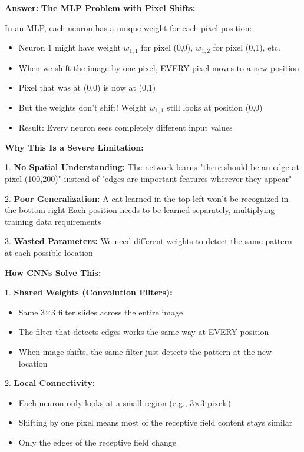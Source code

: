 \documentclass[12pt]{article}
\newcommand{\answer}[1]{{\color{answercolor}\textbf{Answer:} #1}}
\newcommand{\explanation}[1]{{\color{explanationcolor}#1}}
\begin{document}
\begin{enumerate}[(a)]
    \answer{
    \textbf{The MLP Problem with Pixel Shifts:}
    
    \explanation{
    In an MLP, each neuron has a unique weight for each pixel position:
    \begin{itemize}
        \item Neuron 1 might have weight $w_{1,1}$ for pixel (0,0), $w_{1,2}$ for pixel (0,1), etc.
        \item When we shift the image by one pixel, EVERY pixel moves to a new position
        \item Pixel that was at (0,0) is now at (0,1)
        \item But the weights don't shift! Weight $w_{1,1}$ still looks at position (0,0)
        \item Result: Every neuron sees completely different input values
    \end{itemize}
    }
    
    \textbf{Why This Is a Severe Limitation:}
    
    \explanation{
    1. \textbf{No Spatial Understanding:}
    The network learns "there should be an edge at pixel (100,200)" instead of "edges are important features wherever they appear"
    
    2. \textbf{Poor Generalization:}
    A cat learned in the top-left won't be recognized in the bottom-right
    Each position needs to be learned separately, multiplying training data requirements
    
    3. \textbf{Wasted Parameters:}
    We need different weights to detect the same pattern at each possible location
    }
    
    \textbf{How CNNs Solve This:}
    
    \explanation{
    1. \textbf{Shared Weights (Convolution Filters):}
    \begin{itemize}
        \item Same 3×3 filter slides across the entire image
        \item The filter that detects edges works the same way at EVERY position
        \item When image shifts, the same filter just detects the pattern at the new location
    \end{itemize}
    
    2. \textbf{Local Connectivity:}
    \begin{itemize}
        \item Each neuron only looks at a small region (e.g., 3×3 pixels)
        \item Shifting by one pixel means most of the receptive field content stays similar
        \item Only the edges of the receptive field change
    \end{itemize}
    
}}
\end{enumerate}
\end{document}
